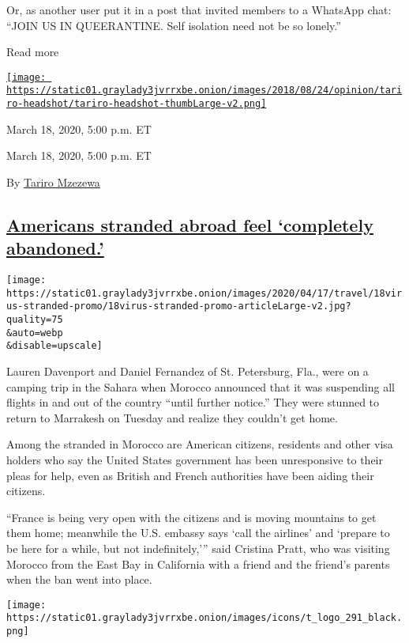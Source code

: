 Or, as another user put it in a post that invited members to a WhatsApp
chat: ``JOIN US IN QUEERANTINE. Self isolation need not be so lonely.''

Read more

\href{https://www.nytimes3xbfgragh.onion/by/tariro-mzezewa}{\texttt{[image: https://static01.graylady3jvrrxbe.onion/images/2018/08/24/opinion/tariro-headshot/tariro-headshot-thumbLarge-v2.png]}}

March 18, 2020, 5:00 p.m. ET

March 18, 2020, 5:00 p.m. ET

By \href{https://www.nytimes3xbfgragh.onion/by/tariro-mzezewa}{Tariro
Mzezewa}

\hypertarget{americans-stranded-abroad-feel-completely-abandoned}{%
\subsection{\texorpdfstring{\protect\hyperlink{americans-stranded-abroad-feel-completely-abandoned}{Americans
stranded abroad feel `completely
abandoned.'}}{Americans stranded abroad feel `completely abandoned.'}}\label{americans-stranded-abroad-feel-completely-abandoned}}

\texttt{[image: https://static01.graylady3jvrrxbe.onion/images/2020/04/17/travel/18virus-stranded-promo/18virus-stranded-promo-articleLarge-v2.jpg?quality=75\\\&auto=webp\\\&disable=upscale]}

Lauren Davenport and Daniel Fernandez of St. Petersburg, Fla., were on a
camping trip in the Sahara when Morocco announced that it was suspending
all flights in and out of the country ``until further notice.'' They
were stunned to return to Marrakesh on Tuesday and realize they couldn't
get home.

Among the stranded in Morocco are American citizens, residents and other
visa holders who say the United States government has been unresponsive
to their pleas for help, even as British and French authorities have
been aiding their citizens.

``France is being very open with the citizens and is moving mountains to
get them home; meanwhile the U.S. embassy says `call the airlines' and
`prepare to be here for a while, but not indefinitely,''' said Cristina
Pratt, who was visiting Morocco from the East Bay in California with a
friend and the friend's parents when the ban went into place.

\texttt{[image: https://static01.graylady3jvrrxbe.onion/images/icons/t\_logo\_291\_black.png]}

